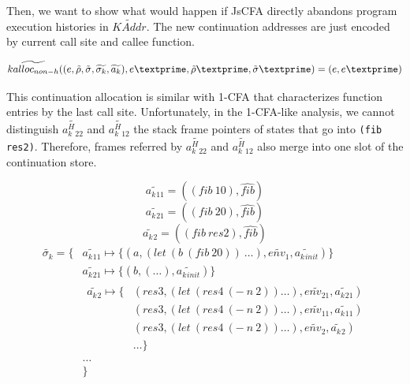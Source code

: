 \documentclass{article}
\begin{document}
Then, we want to show what would happen if JsCFA directly abandons program execution histories in $\widetilde{KAddr}$. The new continuation addresses are just encoded by current call site and callee function.

\[
\widetilde{kalloc_{non-h}} ((e, \tilde{\rho}, \tilde{\sigma}, \widetilde{\sigma_k}, \widetilde{a_k}), e\textprime, \tilde{\rho}\textprime, \tilde{\sigma}\textprime) =
(e, e\textprime)
\]

This continuation allocation is similar with 1-CFA that characterizes function entries by the last call site. Unfortunately, in the 1-CFA-like analysis, we cannot distinguish $\widetilde{a^H_k{}_{22}}$ and $\widetilde{a^H_k{}_{12}}$ the stack frame pointers of states that go into \verb|(fib res2)|. Therefore, frames referred by $\widetilde{a^H_k{}_{22}}$ and $\widetilde{a^H_k{}_{12}}$ also merge into one slot of the continuation store.

\[
\widetilde{a_k{}_{11}} = ((fib\ 10), \widehat{fib})
\]
\[
\widetilde{a_k{}_{21}} = ((fib\ 20), \widehat{fib})
\]
\[
\widetilde{a_k{}_{2}} = ((fib\ res2), \widehat{fib})
\]
\[
\begin{aligned}
\widetilde{\sigma_k} = \{ {}& \widetilde{a_k{}_{11}} \mapsto \{(a, (let\ (b\ (fib\ 20))\ \dots), \widetilde{env_1}, \widetilde{a_k{}_{init}})\}  {} \\
                            & \widetilde{a_k{}_{21}} \mapsto \{(b, (\dots), \widetilde{a_k{}_{init}}) \} {}\\
                            &
                            \begin{aligned}
                              \widetilde{a_k{}_{2}} \mapsto
                              \{{}& (res3, (let\ (res4\ (-\ n\ 2)) \dots), \widetilde{env_{21}}, \widetilde{a_k{}_{21}}) {}\\
                              & (res3, (let\ (res4\ (-\ n\ 2)) \dots), \widetilde{env_{11}}, \widetilde{a_k{}_{11}}) {}\\
                              & (res3, (let\ (res4\ (-\ n\ 2)) \dots), \widetilde{env_2}, \widetilde{a_k{}_{2}}) {} \\
                              & \dots
                              \}
                            \end{aligned} {}\\
                            & \dots {}\\
                            & \}
\end{aligned}
\]
\end{document}
